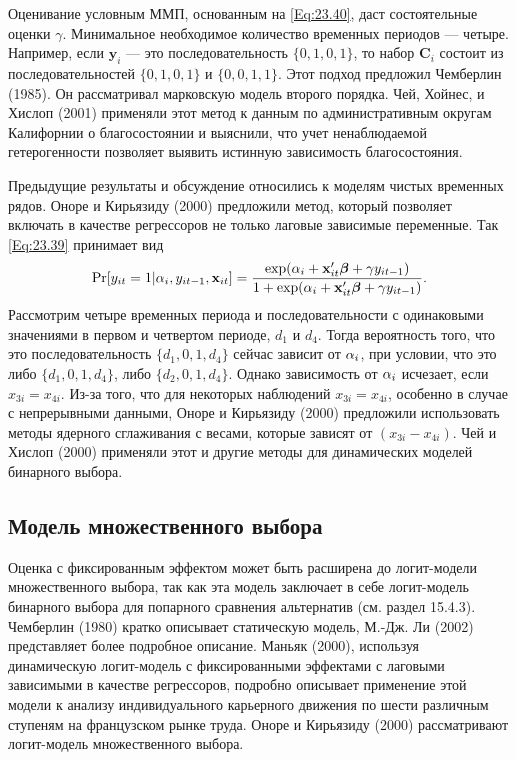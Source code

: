 Оценивание условным ММП, основанным на \ref{Eq:23.40}, даст состоятельные оценки $\gamma$. Минимальное необходимое количество временных периодов --- четыре. Например, если $\mathbf{y}_i$ --- это последовательность $\{ 0, 1, 0, 1\}$, то набор $\mathbf{C}_i$ состоит из последовательностей $\{0, 1, 0, 1\}$ и $\{0, 0, 1, 1\}$. Этот подход предложил Чемберлин (1985). Он рассматривал марковскую модель второго порядка. Чей, Хойнес, и Хислоп (2001) применяли этот метод к данным по административным округам Калифорнии о благосостоянии и выяснили, что учет ненаблюдаемой гетерогенности позволяет выявить истинную зависимость благосостояния.

Предыдущие результаты и обсуждение относились к моделям чистых временных рядов. Оноре и Кирьязиду (2000) предложили метод, который позволяет включать в качестве регрессоров не только лаговые зависимые переменные. Так \ref{Eq:23.39} принимает вид
\begin{align}
\mathrm{Pr} [y_{it}=1|\alpha_i, y_{it-1}, \mathbf{x}_{it}]=
\frac{\exp (\alpha_i+\mathbf{x}'_{it}\bm{\beta} + \gamma y_{it-1})}{1+\exp (\alpha_i+\mathbf{x}'_{it}\bm{\beta}+\gamma y_{it-1})}.
\label{Eq:23.41}
\end{align}
Рассмотрим четыре временных периода и последовательности с одинаковыми значениями в первом и четвертом периоде, $d_1$ и $d_4$. Тогда вероятность того, что это последовательность $\{d_1, 0, 1, d_4 \}$ сейчас зависит от $\alpha_i$, при условии, что это либо $\{d_1, 0, 1, d_4 \}$, либо $\{d_2, 0, 1, d_4 \}$. Однако зависимость от $\alpha_i$ исчезает, если $x_{3i}=x_{4i}$. Из-за того, что для некоторых наблюдений $x_{3i}=x_{4i}$, особенно в случае с непрерывными данными, Оноре и Кирьязиду (2000) предложили использовать методы ядерного сглаживания с весами, которые зависят от $(x_{3i}-x_{4i})$. Чей и Хислоп (2000) применяли этот и другие методы для динамических моделей бинарного выбора.

\subsection{Модель множественного выбора}

Оценка с фиксированным эффектом может быть расширена до логит-модели множественного выбора, так как эта модель заключает в себе логит-модель бинарного выбора для попарного сравнения альтернатив (см. раздел 15.4.3). Чемберлин (1980) кратко описывает статическую модель, М.-Дж. Ли (2002) представляет более подробное описание. Маньяк (2000), используя динамическую логит-модель с фиксированными эффектами с лаговыми зависимыми в качестве регрессоров, подробно описывает применение этой модели к анализу индивидуального карьерного движения по шести различным ступеням на французском рынке труда. Оноре и Кирьязиду (2000) рассматривают логит-модель множественного выбора.

